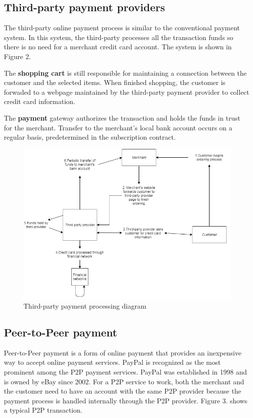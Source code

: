 \documentclass{ferseminar}
\begin{document}
\subsection{Third-party payment providers}

The third-party online payment process is similar to the conventional payment system. In this system, the third-party processes all the transaction funds so there is no need for a merchant credit card account. The system is shown in Figure 2. 

The \textbf{shopping cart} is still responsible for maintaining a connection between the customer and the selected items. When finished shopping, the customer is forwaded to a webpage maintained by the third-party payment provider to collect credit card information.

The \textbf{payment} gateway authorizes the transaction and holds the funds in trust for the merchant. Transfer to the merchant's local bank account occurs on a regular basis, predetermined in the subscription contract.

\begin{figure}[t]
	\caption{Third-party payment processing diagram}
	\includegraphics[scale=0.6]{diagram2}
	\centering
\end{figure}

\subsection{Peer-to-Peer payment}

Peer-to-Peer payment is a form of online payment that provides an inexpensive way to accept online payment services. PayPal is recognized as the most prominent among the P2P payment services. PayPal was established in 1998 and is owned by eBay since 2002. For a P2P service to work, both the merchant and the customer need to have an account with the same P2P provider because the payment process is handled internally through the P2P provider. Figure 3. shows a typical P2P transaction.
\end{document}
